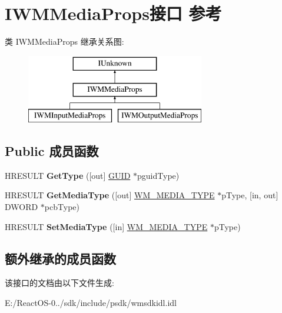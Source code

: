 \hypertarget{interface_i_w_m_media_props}{}\section{I\+W\+M\+Media\+Props接口 参考}
\label{interface_i_w_m_media_props}
类 I\+W\+M\+Media\+Props 继承关系图\+:\begin{figure}[H]
\begin{center}
\leavevmode
\includegraphics[height=3.000000cm]{interface_i_w_m_media_props}
\end{center}
\end{figure}
\subsection*{Public 成员函数}
\begin{DoxyCompactItemize}
\item 
\mbox{\label{interface_i_w_m_media_props_af4a77109f141def48208107a206fe68a}} 
H\+R\+E\+S\+U\+LT {\bfseries Get\+Type} (\mbox{[}out\mbox{]} \hyperlink{interface_g_u_i_d}{G\+U\+ID} $\ast$pguid\+Type)
\item 
\mbox{\label{interface_i_w_m_media_props_ab2cab9d749108fdbaaf7f93c373cbd1d}} 
H\+R\+E\+S\+U\+LT {\bfseries Get\+Media\+Type} (\mbox{[}out\mbox{]} \hyperlink{struct___w_m_media_type}{W\+M\+\_\+\+M\+E\+D\+I\+A\+\_\+\+T\+Y\+PE} $\ast$p\+Type, \mbox{[}in, out\mbox{]} D\+W\+O\+RD $\ast$pcb\+Type)
\item 
\mbox{\label{interface_i_w_m_media_props_ac02c8431914044ad098e2f322fe356b7}} 
H\+R\+E\+S\+U\+LT {\bfseries Set\+Media\+Type} (\mbox{[}in\mbox{]} \hyperlink{struct___w_m_media_type}{W\+M\+\_\+\+M\+E\+D\+I\+A\+\_\+\+T\+Y\+PE} $\ast$p\+Type)
\end{DoxyCompactItemize}
\subsection*{额外继承的成员函数}


该接口的文档由以下文件生成\+:\begin{DoxyCompactItemize}
\item 
E\+:/\+React\+O\+S-\/0../sdk/include/psdk/wmsdkidl.\+idl\end{DoxyCompactItemize}

